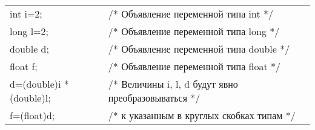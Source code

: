 \begin{pExample}
\begin{tabular}{ l l }
int i=2; & \textcolor{exComm}{/* Объявление переменной типа int */} \\
long l=2; & \textcolor{exComm}{/* Объявление переменной типа long */} \\
double d; & \textcolor{exComm}{/* Объявление переменной типа double */} \\
float f; & \textcolor{exComm}{/* Объявление переменной типа float */} \\
d=(double)i *(double)l; & \textcolor{exComm}{/* Величины i, l, d будут явно преобразовываться */} \\
f=(float)d; & \textcolor{exComm}{/* к указанным в круглых скобках типам */} \\
\end{tabular}
\end{pExample}

\clearpage